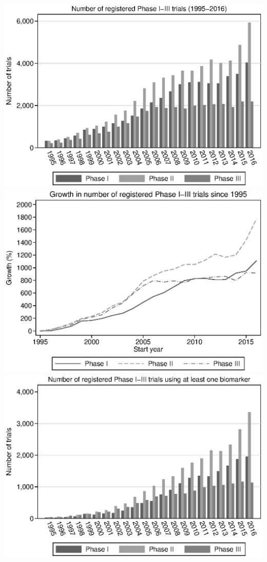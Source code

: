 \includegraphics{../figures/01a-trial_count_by_phase.eps}
\includegraphics{../figures/01b-trial_growth_by_phase.eps}
\includegraphics{../figures/02a-bmkr_count_by_phase.eps}
